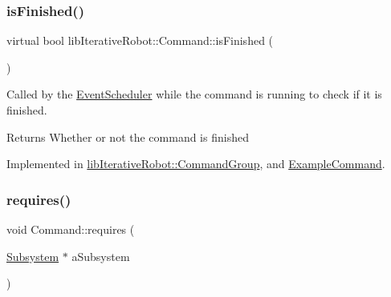 \mbox{\label{classlib_iterative_robot_1_1_command_a8e4dccdd88f432a716090f532ba097f7}} 
\subsubsection{\texorpdfstring{isFinished()}{isFinished()}}
{\footnotesize\ttfamily virtual bool lib\+Iterative\+Robot\+::\+Command\+::is\+Finished (\begin{DoxyParamCaption}{ }\end{DoxyParamCaption})\hspace{0.3cm}{\ttfamily [pure virtual]}}



Called by the \mbox{\hyperlink{classlib_iterative_robot_1_1_event_scheduler}{Event\+Scheduler}} while the command is running to check if it is finished. 

\begin{DoxyReturn}{Returns}
Whether or not the command is finished 
\end{DoxyReturn}


Implemented in \mbox{\hyperlink{classlib_iterative_robot_1_1_command_group_a96807a2763adf9e21ebf2cb9e3574e3c}{lib\+Iterative\+Robot\+::\+Command\+Group}}, and \mbox{\hyperlink{class_example_command_ab4e52d526bda7fe22705b2d3c44286e0}{Example\+Command}}.

\mbox{\label{classlib_iterative_robot_1_1_command_ad7b7f328974f5f17a2a4b1593b6c9eb5}} 
\subsubsection{\texorpdfstring{requires()}{requires()}}
{\footnotesize\ttfamily void Command\+::requires (\begin{DoxyParamCaption}\item[{\mbox{\hyperlink{classlib_iterative_robot_1_1_subsystem}{Subsystem}} $\ast$}]{a\+Subsystem }\end{DoxyParamCaption})\hspace{0.3cm}{\ttfamily [protected]}}



